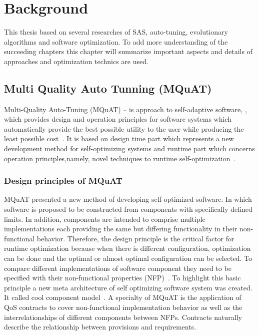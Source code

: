 \chapter{Background}
This thesis based on several researches of SAS, auto-tuning, evolutionary algorithms and software optimization. To add more understanding of the succeeding chapters this chapter will summarize important aspects and details of approaches and optimization technics are used.  

\section{Multi Quality Auto Tunning (MQuAT)}
Multi-Quality Auto-Tuning (MQuAT) – is approach  to self-adaptive software, , which provides design and operation principles for software systems which automatically provide the best possible utility to the user while producing the least possible cost~\cite{gotz13}.
It is based on design time part which represents a new development method  for  self-optimizing  systems and runtime part which concerns  operation  principles,namely,  novel techniques to runtime self-optimization~\cite{gotz13}.

\subsection{Design principles of MQuAT}
MQuAT presented a new method of developing self-optimized software. In which software is proposed to be constructed from components with specifically defined limits. In addition, components are intended to comprise multiple implementations each providing the same but differing functionality in their non-functional behavior. Therefore, the design principle is the critical factor for runtime optimization because when there is different configuration, optimization can be done and the optimal or almost optimal configuration can be selected. To compare different implementations of software component they need to be specified with their non-functional properties (NFP)~\cite{gotz13}.
To highlight this basic principle a new meta architecture of self optimizing software system was created. It called cool component model~\cite{gotz10}.
A specialty of MQuAT is the application of QoS contracts to cover non-functional implementation behavior as well as the interrelationships of different components between NFPs. Contracts naturally describe the relationship between provisions and requirements.

